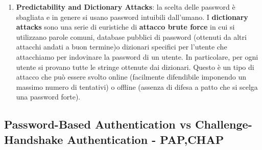 \documentclass{article}
\newtheorem{definition}{Definition}[section]
\theoremstyle{remark}
\newtheorem*{remark}{\textbf{Remark}}
\begin{document}
\begin{enumerate}
\begin{remark}
\begin{itemize}
            Nel caso di giorni e mesi:\begin{equation*}
                H(x)=-log_2(\frac{1}{366})366\frac{1}{366}=9 bit
            \end{equation*}
        \end{itemize}
    \emph{\textbf{Altri Esempi Si trovano sui fogli}}
    \end{remark}
    Riassumendo, il \textbf{valore informativo} di $x_i$ dipende da quanto l'evento $x_i$ è inatteso: minore è la proabilità $p_i$, maggiore è il valore informativo di quell'evento. 
\begin{definition}[Information Content]
\begin{equation*}
    Information\ content = funzione\ di\ \frac{1}{p_i}
\end{equation*}
\end{definition}
\begin{definition}[Entropia]
L'\textbf{entropia} è il valor medio dell'\textbf{information content}.\begin{equation*}
    H(X)=E[IC(X)]=\sum_ip_iIC_i=-\sum_ip_ilog_2(p_i)
\end{equation*}
\end{definition}
\begin{center}
    \texttt{[image: entropy.png]}
\end{center}
    \item \textbf{Predictability and Dictionary Attacks}: la scelta delle password è sbagliata e in genere si usano password intuibili dall'umano. I \textbf{dictionary attacks} sono una serie di euristiche di \textbf{attacco brute force} in cui si utilizzano parole comuni, database pubblici di password (ottenuti da altri attacchi andati a buon termine)o dizionari specifici per l'utente che attacchiamo per indovinare la password di un utente. In particolare, per ogni utente si provano tutte le stringe ottenute dai dizionari. Questo è un tipo di attacco che può essere svolto online (facilmente difendibile imponendo un massimo numero di tentativi) o offline (assenza di difesa a patto che si scelga una password forte).
\end{enumerate}
\subsection{Password-Based Authentication vs Challenge-Handshake Authentication - PAP,CHAP}
\end{document}
